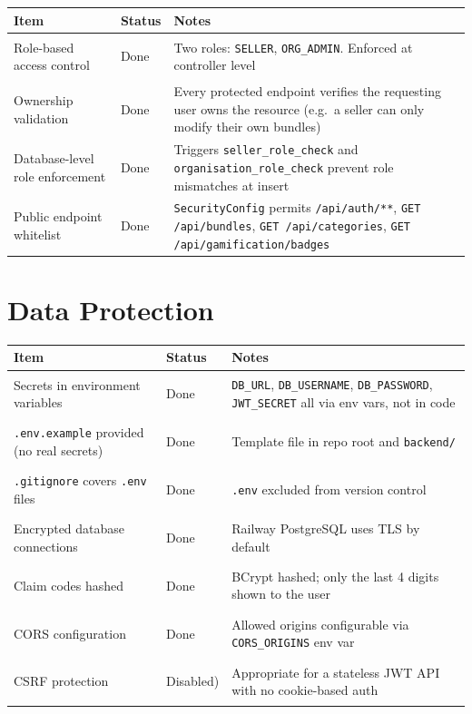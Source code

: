 \documentclass[]{report}
\newcommand{\done}{\colorbox{done}{\strut Done}}
\newcommand{\disabled}{\colorbox{partial}{\strut Disabled)}}
\begin{document}
\begin{longtable}{|p{4.5cm}|p{2.5cm}|p{7cm}|}
\hline
\textbf{Item} & \textbf{Status} & \textbf{Notes} \\
\hline
Role-based access control & \done & Two roles: \texttt{SELLER}, \texttt{ORG\_ADMIN}. Enforced at controller level \\
\hline
Ownership validation & \done & Every protected endpoint verifies the requesting user owns the resource (e.g.\ a seller can only modify their own bundles) \\
\hline
Database-level role enforcement & \done & Triggers \texttt{seller\_role\_check} and \texttt{organisation\_role\_check} prevent role mismatches at insert \\
\hline
Public endpoint whitelist & \done & \texttt{SecurityConfig} permits \texttt{/api/auth/**}, \texttt{GET /api/bundles}, \texttt{GET /api/categories}, \texttt{GET /api/gamification/badges} \\
\hline
\end{longtable}

\section*{Data Protection}

\begin{longtable}{|p{4.5cm}|p{2.5cm}|p{7cm}|}
\hline
\textbf{Item} & \textbf{Status} & \textbf{Notes} \\
\hline
Secrets in environment variables & \done & \texttt{DB\_URL}, \texttt{DB\_USERNAME}, \texttt{DB\_PASSWORD}, \texttt{JWT\_SECRET} all via env vars, not in code \\
\hline
\texttt{.env.example} provided (no real secrets) & \done & Template file in repo root and \texttt{backend/} \\
\hline
\texttt{.gitignore} covers \texttt{.env} files & \done & \texttt{.env} excluded from version control \\
\hline
Encrypted database connections & \done & Railway PostgreSQL uses TLS by default \\
\hline
Claim codes hashed & \done & BCrypt hashed; only the last 4 digits shown to the user \\
\hline
CORS configuration & \done & Allowed origins configurable via \texttt{CORS\_ORIGINS} env var \\
\hline
CSRF protection & \disabled & Appropriate for a stateless JWT API with no cookie-based auth \\
\hline
\end{longtable}
\end{document}
